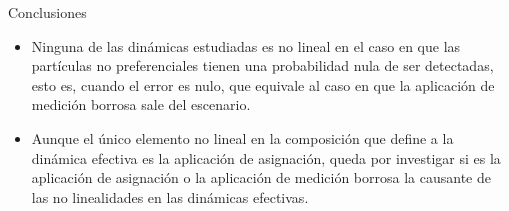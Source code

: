 \begin{frame}{Conclusiones}
    \begin{itemize}
        \item Ninguna de las dinámicas estudiadas es no lineal en el caso en que las partículas no preferenciales tienen una probabilidad nula de ser detectadas, esto es, cuando el error es nulo, que equivale al caso en que la aplicación de medición borrosa sale del escenario.
        \item Aunque el único elemento no lineal en la composición que define a la dinámica efectiva es la aplicación de asignación, queda por investigar si es la aplicación de asignación o la aplicación de medición borrosa la causante de las no linealidades en las dinámicas efectivas.
    \end{itemize}
\end{frame}